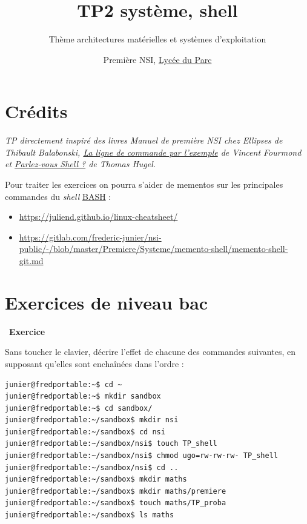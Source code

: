 \documentclass[
  11pt,
]{article}
\title{TP2 système, shell}
\subtitle{Thème architectures matérielles et systèmes d'exploitation}
\author{Première NSI, \href{https://frederic-junier.org/}{Lycée du Parc}}
\date{}
\providecommand{\tightlist}{%
  \setlength{\itemsep}{0pt}\setlength{\parskip}{0pt}}
\newcounter{exo}
\newenvironment{exercice}[1]
{\par \medskip   \addtocounter{exo}{1} \noindent  
\begin{bclogo}[arrondi =0.1,   noborder = true, logo=\bccrayon, marge=4]{~\textbf{Exercice} \textbf{\theexo} {\itshape #1} }  \par}
{
\end{bclogo}
 \par \bigskip }
\begin{document}
\maketitle

\hypertarget{cruxe9dits}{%
\section*{Crédits}\label{cruxe9dits}}

\emph{TP directement inspiré des livres Manuel de première NSI chez
Ellipses de Thibault Balabonski,
\href{https://www.eyrolles.com/Informatique/Livre/la-ligne-de-commande-par-l-exemple-9782351410721/}{La
ligne de commande par l'exemple} de Vincent Fourmond et
\href{https://www.eyrolles.com/Informatique/Livre/parlez-vous-shell--9782729877590/}{Parlez-vous
Shell ?} de Thomas Hugel.}

Pour traiter les exercices on pourra s'aider de mementos sur les
principales commandes du \emph{shell}
\href{https://fr.wikipedia.org/wiki/Bourne-Again_shell}{BASH} :

\begin{itemize}
\tightlist
\item
  \url{https://juliend.github.io/linux-cheatsheet/}
\item
  \url{https://gitlab.com/frederic-junier/nsi-public/-/blob/master/Premiere/Systeme/memento-shell/memento-shell-git.md}
\end{itemize}

\hypertarget{exercices-de-niveau-bac}{%
\section{Exercices de niveau bac}\label{exercices-de-niveau-bac}}

\begin{exercice}{}

Sans toucher le clavier, décrire l'effet de chacune des commandes
suivantes, en supposant qu'elles sont enchaînées dans l'ordre :

\begin{verbatim}
junier@fredportable:~$ cd ~
junier@fredportable:~$ mkdir sandbox
junier@fredportable:~$ cd sandbox/
junier@fredportable:~/sandbox$ mkdir nsi
junier@fredportable:~/sandbox$ cd nsi 
junier@fredportable:~/sandbox/nsi$ touch TP_shell
junier@fredportable:~/sandbox/nsi$ chmod ugo=rw-rw-rw- TP_shell 
junier@fredportable:~/sandbox/nsi$ cd ..
junier@fredportable:~/sandbox$ mkdir maths
junier@fredportable:~/sandbox$ mkdir maths/premiere
junier@fredportable:~/sandbox$ touch maths/TP_proba
junier@fredportable:~/sandbox$ ls maths
\end{verbatim}

\end{exercice}
\end{document}
